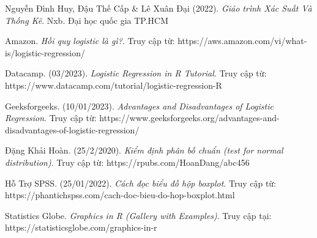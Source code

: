 \documentclass[a4paper]{article}
\begin{document}
\begin{thebibliography}{80}
\item Nguyễn Đình Huy, Đậu Thế Cấp \& Lê Xuân Đại (2022). \textit{Giáo trình Xác Suất Và Thống Kê}. Nxb. Đại học quốc gia TP.HCM

\item Amazon. \textit{Hồi quy logistic là gì?}. Truy cập từ: https://aws.amazon.com/vi/what-is/logistic-regression/
\item Datacamp. (03/2023).
\textit{Logistic Regression in R Tutorial}. Truy cập từ: https://www.datacamp.com/tutorial/logistic-regression-R

\item Geeksforgeeks. (10/01/2023). 
\textit{Advantages and Disadvantages of Logistic Regression}. Truy cập từ: https://www.geeksforgeeks.org/advantages-and-disadvantages-of-logistic-regression/

\item Đặng Khải Hoàn. (25/2/2020). \textit{Kiểm định phân bố chuẩn (test for normal distribution)}. Truy cập từ: https://rpubs.com/HoanDang/abc456
\item Hỗ Trợ SPSS. (25/01/2022). \textit{Cách đọc biểu đồ hộp boxplot}. Truy cập từ: https://phantichspss.com/cach-doc-bieu-do-hop-boxplot.html
\item Statistics Globe. \textit{Graphics in R (Gallery with Examples)}. Truy cập tại: https://statisticsglobe.com/graphics-in-r
\end{thebibliography}
\end{document}
